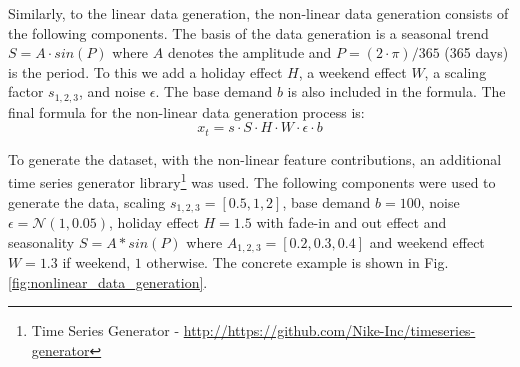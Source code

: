 Similarly, to the linear data generation, the non-linear data generation consists of the following components.
The basis of the data generation is a seasonal trend $S = A \cdot sin(P)$ where $A$ denotes the amplitude and $P= (2 \cdot \pi)/365$ (365 days) is the period. To this we add a holiday effect $H$, a weekend effect $W$, a scaling factor $s_{1,2,3}$, and noise $\epsilon$. The base demand $b$ is also included in the formula.
The final formula for the non-linear data generation process is:
$$
x_t = s \cdot S \cdot H \cdot W \cdot \epsilon \cdot b
$$


To generate the dataset, with the non-linear feature contributions, an additional time series generator library\footnote{Time Series Generator - \url{http://https://github.com/Nike-Inc/timeseries-generator}\label{timeseries-generator}} was used.
The following components were used to generate the data, scaling $s_{1,2,3} = [0.5,1,2]$, base demand $b=100$, noise $\epsilon = \mathcal{N}(1,0.05)$, holiday effect $H=1.5$ with fade-in and out effect and seasonality $S = A * sin(P)$ where $A_{1,2,3} = [0.2,0.3,0.4]$ and weekend effect $W = 1.3$ if weekend, $1$ otherwise.
The concrete example is shown in Fig. \ref{fig:nonlinear_data_generation}.

